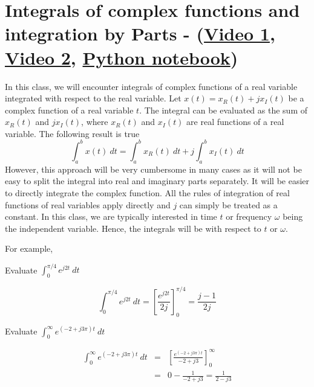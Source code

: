 \newpage

\section{Integrals of complex functions and integration by Parts -
(\href{https://youtu.be/CnbOzrYMJZE}{Video 1},
\href{https://youtu.be/4ltOPFdEeDY}{Video 2},
\href{https://colab.research.google.com/drive/1xX4C8epyw96KdPEsHzp1Xrq34HPCaIm4?usp=sharing}{Python notebook})}
In this class, we will encounter integrals of complex functions of a real variable integrated with respect to the real variable.
Let $x(t) = x_R(t)+jx_I(t)$ be a complex function of a real variable $t$.
The integral can be evaluated as the sum of $x_R(t)$ and $j x_I(t)$, where $x_R(t)$ and $x_I(t)$ are real functions of a real variable. The following result is true
\begin{equation}\label{eqn:integralcomplexfunctionofarealvariable1}
  \int_{a}^{b} x(t) \ dt = \int_{a}^{b} x_R(t) \ dt + j \int_{a}^{b} x_I(t) \ dt
\end{equation}
However, this approach will be very cumbersome in many cases as it will not be easy to split the integral into real and imaginary parts separately.
It will be easier to directly integrate the complex function.
All the rules of integration of real functions of real variables apply directly and $j$ can simply be treated as a constant.
In this class, we are typically interested in time $t$ or frequency $\omega$ being the independent variable.
Hence, the integrals will be with respect to $t$ or $\omega$.

For example,

\begin{example} Evaluate $\displaystyle{\int_0^{\pi/4} e^{j 2 t} \ dt}$

\[
\displaystyle{
\int_0^{\pi/4} e^{j 2 t} \ dt = \left[\frac{e^{j 2 t}}{2 j}\right]_{0}^{\pi/4} = \frac{j-1}{2j}
}
\]
\end{example}


\begin{example}
Evaluate $\displaystyle{\int_0^\infty e^{(-2+j3\pi)t} \ dt} $

\begin{eqnarray*}
  \displaystyle{\int_0^\infty e^{(-2+j3\pi)t} \ dt}  &=& \left[ \frac{e^{(-2+j3\pi)t}}{-2+j3} \right]_{0}^{\infty} \\
   &=& 0 - \frac{1}{-2+j3} = \frac{1}{2-j3}
\end{eqnarray*}
\end{example}

